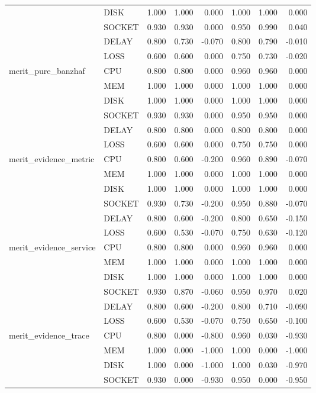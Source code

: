 \begin{longtable}{llrrrrrr}
 & DISK & 1.000 & 1.000 & 0.000 & 1.000 & 1.000 & 0.000 \\
 & SOCKET & 0.930 & 0.930 & 0.000 & 0.950 & 0.990 & 0.040 \\
 & DELAY & 0.800 & 0.730 & -0.070 & 0.800 & 0.790 & -0.010 \\
 & LOSS & 0.600 & 0.600 & 0.000 & 0.750 & 0.730 & -0.020 \\
merit\_pure\_banzhaf & CPU & 0.800 & 0.800 & 0.000 & 0.960 & 0.960 & 0.000 \\
 & MEM & 1.000 & 1.000 & 0.000 & 1.000 & 1.000 & 0.000 \\
 & DISK & 1.000 & 1.000 & 0.000 & 1.000 & 1.000 & 0.000 \\
 & SOCKET & 0.930 & 0.930 & 0.000 & 0.950 & 0.950 & 0.000 \\
 & DELAY & 0.800 & 0.800 & 0.000 & 0.800 & 0.800 & 0.000 \\
 & LOSS & 0.600 & 0.600 & 0.000 & 0.750 & 0.750 & 0.000 \\
merit\_evidence\_metric & CPU & 0.800 & 0.600 & -0.200 & 0.960 & 0.890 & -0.070 \\
 & MEM & 1.000 & 1.000 & 0.000 & 1.000 & 1.000 & 0.000 \\
 & DISK & 1.000 & 1.000 & 0.000 & 1.000 & 1.000 & 0.000 \\
 & SOCKET & 0.930 & 0.730 & -0.200 & 0.950 & 0.880 & -0.070 \\
 & DELAY & 0.800 & 0.600 & -0.200 & 0.800 & 0.650 & -0.150 \\
 & LOSS & 0.600 & 0.530 & -0.070 & 0.750 & 0.630 & -0.120 \\
merit\_evidence\_service & CPU & 0.800 & 0.800 & 0.000 & 0.960 & 0.960 & 0.000 \\
 & MEM & 1.000 & 1.000 & 0.000 & 1.000 & 1.000 & 0.000 \\
 & DISK & 1.000 & 1.000 & 0.000 & 1.000 & 1.000 & 0.000 \\
 & SOCKET & 0.930 & 0.870 & -0.060 & 0.950 & 0.970 & 0.020 \\
 & DELAY & 0.800 & 0.600 & -0.200 & 0.800 & 0.710 & -0.090 \\
 & LOSS & 0.600 & 0.530 & -0.070 & 0.750 & 0.650 & -0.100 \\
merit\_evidence\_trace & CPU & 0.800 & 0.000 & -0.800 & 0.960 & 0.030 & -0.930 \\
 & MEM & 1.000 & 0.000 & -1.000 & 1.000 & 0.000 & -1.000 \\
 & DISK & 1.000 & 0.000 & -1.000 & 1.000 & 0.030 & -0.970 \\
 & SOCKET & 0.930 & 0.000 & -0.930 & 0.950 & 0.000 & -0.950 \\

\end{longtable}
